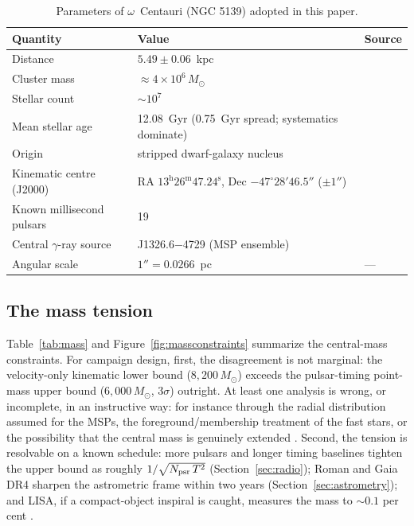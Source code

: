 \documentclass[11pt]{article}
\newcommand{\msun}{\ensuremath{M_\odot}}
\begin{document}
\begin{table}[tbp]
\centering
\caption{Parameters of $\omega$~Centauri (NGC 5139) adopted in this paper.}
\label{tab:ocparams}
\small
\begin{tabular}{l p{6.0cm} p{4.4cm}}
\toprule
Quantity & Value & Source \\
\midrule
Distance & $5.49 \pm 0.06$~kpc & \citet{Haberle2025oMEGACatVI} \\
Cluster mass & $\approx 4\times10^{6}\,\msun$ & \citet{Harris1996,BaumgardtVasiliev2021} \\
Stellar count & $\sim 10^{7}$ & \citet{Harris1996} \\
Mean stellar age & 12.08~Gyr (0.75~Gyr spread; systematics dominate) & \citet{Clontz2024} \\
Origin & stripped dwarf-galaxy nucleus & \citet{HilkerRichtler2000,Ibata2019,Souza2026oMEGACatX} \\
Kinematic centre (J2000) & RA $13^{\mathrm{h}}26^{\mathrm{m}}47.24^{\mathrm{s}}$, Dec $-47^{\circ}28'46.5''$ ($\pm 1''$) & \citet{AndersonvanderMarel2010} \\
Known millisecond pulsars & 19 & \citet{Dai2020,Chen2023,ColomiBernadich2026} \\
Central $\gamma$-ray source & J1326.6$-$4729 (MSP ensemble) & \citet{Dai2020,Dai2023} \\
Angular scale & $1'' = 0.0266$~pc & --- \\
\bottomrule
\end{tabular}
\end{table}

\subsection{The mass tension}
\label{sec:tension}

Table~\ref{tab:mass} and Figure~\ref{fig:massconstraints} summarize the central-mass constraints. For campaign design, first, the disagreement is not marginal: the velocity-only kinematic lower bound ($8{,}200\,\msun$) exceeds the pulsar-timing point-mass upper bound ($6{,}000\,\msun$, $3\sigma$) outright. At least one analysis is wrong, or incomplete, in an instructive way: for instance through the radial distribution assumed for the MSPs, the foreground/membership treatment of the fast stars, or the possibility that the central mass is genuinely extended \citep{BanaresHernandez2025,Zocchi2019,BreenHeggie2013}. Second, the tension is resolvable on a known schedule: more pulsars and longer timing baselines tighten the upper bound as roughly $1/\sqrt{N_{\rm psr}\,T^{2}}$ (Section~\ref{sec:radio}); Roman and Gaia DR4 sharpen the astrometric frame within two years (Section~\ref{sec:astrometry}); and LISA, if a compact-object inspiral is caught, measures the mass to $\sim 0.1$ per cent \citep{Babak2017}.
\end{document}
